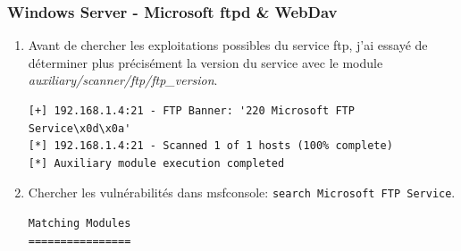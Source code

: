 \documentclass[a4paper]{article}
\begin{document}
\newpage \subsubsection{Windows Server - Microsoft ftpd \& WebDav}





\begin{enumerate}
    \item Avant de chercher les exploitations possibles du service ftp, j'ai essayé de déterminer plus précisément la version du service avec le module \textit{auxiliary/scanner/ftp/ftp\_version}.
    \begin{example}
\begin{Verbatim}[fontsize=\footnotesize]
[+] 192.168.1.4:21 - FTP Banner: '220 Microsoft FTP Service\x0d\x0a'
[*] 192.168.1.4:21 - Scanned 1 of 1 hosts (100% complete)
[*] Auxiliary module execution completed
\end{Verbatim}
    \end{example}
    \item Chercher les vulnérabilités dans msfconsole: \texttt{\footnotesize search Microsoft FTP Service}.
    \begin{example}
\begin{Verbatim}[fontsize=\footnotesize]
Matching Modules
================


\end{Verbatim}
\end{example}
\end{enumerate}
\end{document}
